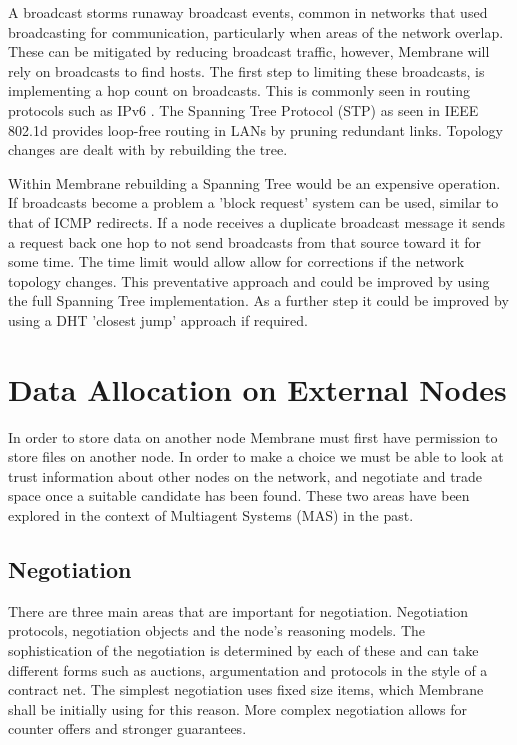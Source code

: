\documentclass[a4paper,11pt, twocolumn]{report}
\begin{document}
A broadcast storms runaway broadcast events, common in networks that used broadcasting for communication, particularly when areas of the network overlap. \citep{Tseng:2002:BSP:506900.506905} These can be mitigated by reducing broadcast traffic, however, Membrane will rely on broadcasts to find hosts. The first step to limiting these broadcasts, is implementing a hop count on broadcasts. This is commonly seen in routing protocols such as IPv6 \citep{deering1998internet}. The Spanning Tree Protocol (STP) as seen in IEEE 802.1d \citep*{ieee802ieee, sharma2004viking} provides loop-free routing in LANs by pruning redundant links. Topology changes are dealt with by rebuilding the tree.

Within Membrane rebuilding a Spanning Tree would be an expensive operation. If broadcasts become a problem a 'block request' system can be used, similar to that of ICMP redirects. \citep{postel1981rfc} If a node receives a duplicate broadcast message it sends a request back one hop to not send broadcasts from that source toward it for  some time. The time limit would allow allow for corrections if the network topology changes. This preventative approach and could be improved by using the full Spanning Tree implementation. As a further step it could be improved by using a DHT 'closest jump' approach if required.

\section{Data Allocation on External Nodes}

In order to store data on another node Membrane must first have permission to store files on another node. In order to make a choice we must be able to look at trust information about other nodes on the network, and negotiate and trade space once a suitable candidate has been found. These two areas have been explored in the context of Multiagent Systems (MAS) in the past. \citep{wooldridge2009introduction}

\subsection{Negotiation}
There are three main areas that are important for negotiation. Negotiation protocols, negotiation objects and the node's reasoning models. \citep{beer1999negotiation} The sophistication of the negotiation is determined by each of these and can take different forms such as auctions, argumentation and protocols in the style of a contract net. The simplest negotiation uses fixed size items, which Membrane shall be initially using for this reason. More complex negotiation allows for counter offers and stronger guarantees.
\end{document}
